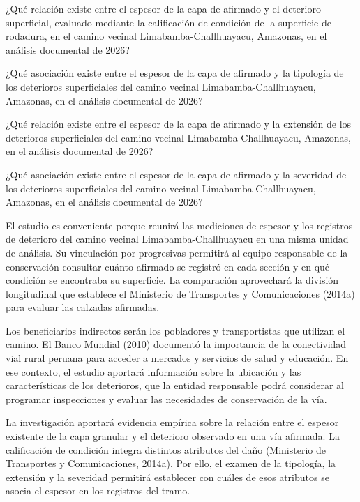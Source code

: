 \documentclass[12pt,a4paper]{article}
\begin{document}
¿Qué relación existe entre el espesor de la capa de afirmado y el deterioro superficial, evaluado mediante la calificación de condición de la superficie de rodadura, en el camino vecinal Limabamba-Challhuayacu, Amazonas, en el análisis documental de 2026?

\begin{listaTrasTitulo}
\item ¿Qué asociación existe entre el espesor de la capa de afirmado y la tipología de los deterioros superficiales del camino vecinal Limabamba-Challhuayacu, Amazonas, en el análisis documental de 2026?
\item ¿Qué relación existe entre el espesor de la capa de afirmado y la extensión de los deterioros superficiales del camino vecinal Limabamba-Challhuayacu, Amazonas, en el análisis documental de 2026?
\item ¿Qué asociación existe entre el espesor de la capa de afirmado y la severidad de los deterioros superficiales del camino vecinal Limabamba-Challhuayacu, Amazonas, en el análisis documental de 2026?
\end{listaTrasTitulo}

El estudio es conveniente porque reunirá las mediciones de espesor y los registros de deterioro del camino vecinal Limabamba-Challhuayacu en una misma unidad de análisis. Su vinculación por progresivas permitirá al equipo responsable de la conservación consultar cuánto afirmado se registró en cada sección y en qué condición se encontraba su superficie. La comparación aprovechará la división longitudinal que establece el Ministerio de Transportes y Comunicaciones (2014a) para evaluar las calzadas afirmadas.

Los beneficiarios indirectos serán los pobladores y transportistas que utilizan el camino. El Banco Mundial (2010) documentó la importancia de la conectividad vial rural peruana para acceder a mercados y servicios de salud y educación. En ese contexto, el estudio aportará información sobre la ubicación y las características de los deterioros, que la entidad responsable podrá considerar al programar inspecciones y evaluar las necesidades de conservación de la vía.

La investigación aportará evidencia empírica sobre la relación entre el espesor existente de la capa granular y el deterioro observado en una vía afirmada. La calificación de condición integra distintos atributos del daño (Ministerio de Transportes y Comunicaciones, 2014a). Por ello, el examen de la tipología, la extensión y la severidad permitirá establecer con cuáles de esos atributos se asocia el espesor en los registros del tramo.
\end{document}

